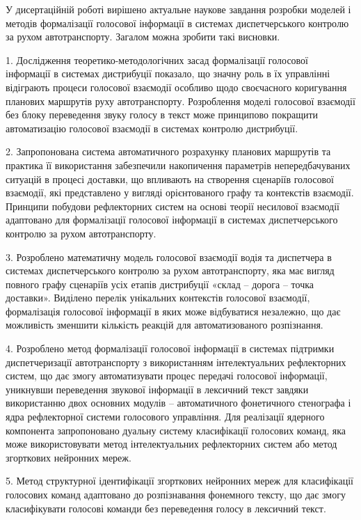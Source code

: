 У дисертаційній роботі вирішено актуальне наукове завдання розробки моделей і методів формалізації голосової інформації в системах диспетчерського контролю за рухом автотранспорту. Загалом можна зробити такі висновки.

1. Дослідження теоретико-методологічних засад формалізації голосової інформації в системах дистрибуції показало, що значну роль в їх управлінні відіграють процеси голосової взаємодії особливо щодо своєчасного коригування планових маршрутів руху автотранспорту. Розроблення моделі голосової взаємодії без блоку переведення звуку голосу в текст може принципово покращити автоматизацію голосової взаємодії в системах контролю дистрибуції.

2. Запропонована система автоматичного розрахунку планових маршрутів та практика її використання забезпечили накопичення параметрів непередбачуваних ситуацій в процесі доставки, що впливають на створення сценаріїв голосової взаємодії, які представлено у вигляді орієнтованого графу та контекстів взаємодії.
Принципи побудови рефлекторних систем на основі теорії несилової взаємодії адаптовано для формалізації голосової інформації в системах диспетчерського контролю за рухом автотранспорту.

3. Розроблено математичну модель голосової взаємодії водія та диспетчера в системах диспетчерського контролю за рухом автотранспорту, яка має вигляд повного графу сценаріїв усіх етапів дистрибуції «склад – дорога – точка доставки». Виділено перелік унікальних контекстів голосової взаємодії, формалізація голосової інформації в яких може відбуватися незалежно, що дає можливість зменшити кількість реакцій для автоматизованого розпізнання.

4. Розроблено метод формалізації голосової інформації в системах підтримки диспетчеризації автотранспорту з використанням інтелектуальних рефлекторних систем, що дає змогу автоматизувати процес передачі голосової інформації, уникнувши переведення звукової інформації в лексичний текст завдяки використанню двох основних модулів – автоматичного фонетичного стенографа і ядра рефлекторної системи голосового управління. Для реалізації ядерного компонента запропоновано дуальну систему класифікації голосових команд, яка може використовувати метод інтелектуальних рефлекторних систем або метод згорткових нейронних мереж.

5. Метод структурної ідентифікації згорткових нейронних мереж для класифікації голосових команд адаптовано до розпізнавання фонемного тексту, що дає змогу класифікувати голосові команди без переведення голосу в лексичний текст.


